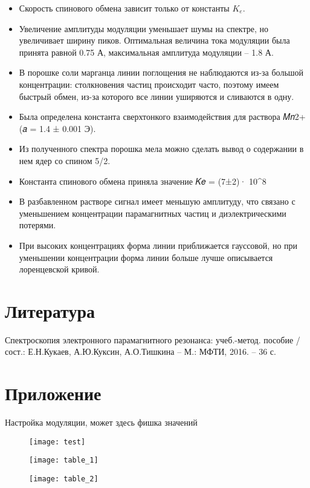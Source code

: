 \documentclass[a4paper,12pt]{article}
\begin{document}
	\begin{itemize}
	\item Скорость спинового обмена зависит только от константы $K_e$.
	\item Увеличение амплитуды модуляции уменьшает шумы на спектре, но увеличивает ширину пиков. Оптимальная величина тока модуляции была принята равной 0.75 А, максимальная
амплитуда модуляции – 1.8 А.
	\item В порошке соли марганца линии поглощения не наблюдаются из-за большой концентрации: столкновения частиц происходит часто, поэтому имеем быстрый обмен, из-за которого все линии уширяются и сливаются в одну.
	\item Была определена константа сверхтонкого взаимодействия для раствора 𝑀𝑛2+ (𝑎 = 1.4 ± 0.001 Э).
	\item Из полученного спектра порошка мела можно сделать вывод о содержании в нем ядер со спином 5/2.
	\item Константа спинового обмена приняла значение
𝐾𝑒 = (7±2)· 10^8 
	\item В разбавленном растворе сигнал имеет меньшую амплитуду, что связано с уменьшением концентрации парамагнитных частиц и диэлектрическими потерями.
	\item При высоких концентрациях форма линии приближается гауссовой,
	но при уменьшении концентрации форма линии больше лучше описывается лоренцевской кривой.
	\end{itemize}
\vspace{4cm}
\section{Литература}
	 Спектроскопия электронного парамагнитного резонанса: учеб.-метод.
пособие / сост.: Е.Н.Кукаев, А.Ю.Куксин, А.О.Тишкина – М.: МФТИ,
2016. – 36 с.

\newpage
\section{Приложение}
	Настройка модуляции, может здесь фишка значений
\begin{figure}[H]
		\begin{center}
			\texttt{[image: test]}
		\end{center}
	\end{figure}
	
	
\begin{figure}[H]
		\begin{center}
			\texttt{[image: table\_1]}
		\end{center}
	\end{figure}
	
	
\vspace{3cm}
\begin{figure}[H]
		\begin{center}
			\texttt{[image: table\_2]}
		\end{center}
	\end{figure}
\end{document}
